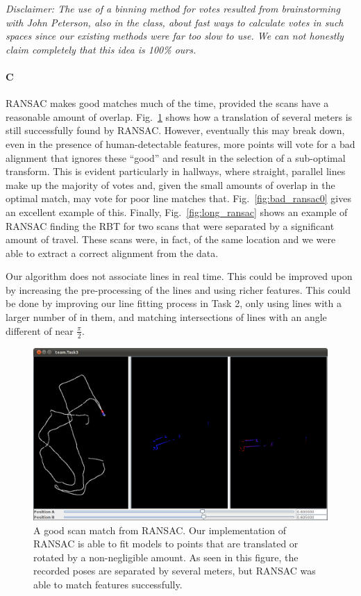 \documentclass[12pt]{article}
\begin{document}
\emph{Disclaimer: The use of a binning method for votes resulted from brainstorming with John Peterson,
    also in the class, about fast ways to calculate votes in such spaces since our existing methods
    were far too slow to use. We can not honestly claim completely that this idea is 100\% ours.}

\paragraph{C}
RANSAC makes good matches much of the time, provided the scans have a reasonable
amount of overlap. Fig.~\ref{fig:good_ransac0} shows how a translation of several
meters is still successfully found by RANSAC. However, eventually this may break
down, even in the presence of human-detectable features, more points will vote
for a bad alignment that ignores these ``good'' and result in the selection of
a sub-optimal transform. This is evident particularly in hallways, where straight,
parallel lines make up the majority of votes and, given the small amounts of overlap in
the optimal match, may vote for poor line matches that. Fig.~\ref{fig:bad_ransac0} gives
an excellent example of this. Finally, Fig.~\ref{fig:long_ransac} shows an example of
RANSAC finding the RBT for two scans that were separated by a significant amount
of travel. These scans were, in fact, of the same location and we were able to extract
a correct alignment from the data.

Our algorithm does not associate lines in real time.  This could be improved upon by
increasing the pre-processing of the lines and using richer features.  This could be done
by improving our line fitting process in Task 2, only using lines with a larger number of
in them, and matching intersections of lines with an angle different of near $\frac{\pi}{2}$.


\begin{figure}[h!]
\centering
\includegraphics[width=.7\textwidth]{figures/Task3_good0.png}
\caption{A good scan match from RANSAC. Our implementation of RANSAC is able
to fit models to points that are translated or rotated by a non-negligible amount. As seen
in this figure, the recorded poses are separated by several meters, but RANSAC
was able to match features successfully.}
\label{fig:good_ransac0}
\end{figure}
\end{document}
